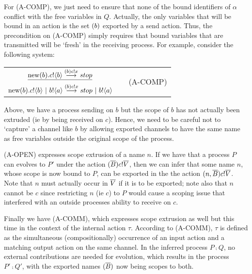 For (A-COMP), we just need to ensure that none of the bound identifiers of $\alpha$ conflict with the free variables in $Q$.  
Actually, the only variables that will be bound in an action is the set $({b})$ exported by a send action.  
Thus, the precondition on (A-COMP) simply requires that bound variables that are transmitted will be `fresh' in the receiving process.  
For example, consider the following system:
\begin{center}\begin{tabular}{rllll}
	\multicolumn{3}{c}{$\underline{\text{new}({b}).{c}!\langle{b}\rangle\overset{{({b}){c}!{x}}}{\longrightarrow} stop}$} & & \multirow{2}{*}{\tiny{(A-COMP)}}\\
	\multicolumn{3}{c}{$\text{new}({b}).{c}!\langle{b}\rangle \ |\  {b}!\langle{a}\rangle\overset{{({b}){c}!{x}}}{\longrightarrow} stop\ |\  {b}!\langle{a}\rangle$}\\[10pt]
\end{tabular}\end{center}
Above, we have a process sending on $b$ but the scope of $b$ has not actually been extruded (ie by being received on $c$).  
Hence, we need to be careful not to `capture' a channel like $b$ by allowing exported channels to have the same name as free variables outside the original scope of the process.

(A-OPEN) expresses scope extrusion of a name $n$.  
If we have that a process $P$ can evolves to $P'$ under the action $({\overline{B}}){c}!{\overline{V}}$, then we can infer that some name $n$, whose scope is now bound to $P$, can be exported in the the action $({n,\overline{B}}){c}!{\overline{V}}$.  
Note that $n$ must actually occur in $\overline{V}$ if it is to be exported; note also that $n$ cannot be $c$ since restricting $n$ (ie $c$) to $P$ would cause a scoping issue that interfered with an outside processes ability to receive on $c$.

Finally we have (A-COMM), which expresses scope extrusion as well but this time in the context of the internal action $\tau$.  
According to (A-COMM), $\tau$ is defined as the simultaneous (compositionally) occurrence of an input action and a matching output action on the same channel.  
In the inferred process $P\comp Q$, no external contributions are needed for evolution, which results in the process $P'\comp Q'$, with the exported names $({\overline{B}})$ now being scopes to both.

